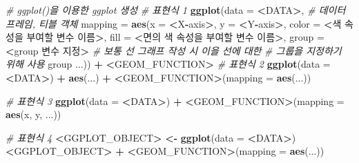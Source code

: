 \documentclass[
  11pt,
]{krantz}
\newenvironment{Shaded}{\begin{snugshade}}{\end{snugshade}}
\newcommand{\CommentTok}[1]{\textcolor[rgb]{0.37,0.37,0.37}{\textit{#1}}}
\newcommand{\DataTypeTok}[1]{\textcolor[rgb]{0.27,0.27,0.27}{#1}}
\newcommand{\ErrorTok}[1]{\textcolor[rgb]{0.14,0.14,0.14}{\textbf{#1}}}
\newcommand{\KeywordTok}[1]{\textcolor[rgb]{0.27,0.27,0.27}{\textbf{#1}}}
\newcommand{\NormalTok}[1]{#1}
\newcommand{\OperatorTok}[1]{\textcolor[rgb]{0.43,0.43,0.43}{\textbf{#1}}}
\newcommand{\StringTok}[1]{\textcolor[rgb]{0.5,0.5,0.5}{#1}}
\begin{document}
\begin{Shaded}
\begin{Highlighting}[]
\CommentTok{# ggplot()을 이용한 ggplot 생성}
\CommentTok{# 표현식 1}
\KeywordTok{ggplot}\NormalTok{(}\DataTypeTok{data =} \OperatorTok{<}\NormalTok{DATA}\OperatorTok{>}\NormalTok{, }\CommentTok{# 데이터 프레임, 티블 객체}
       \DataTypeTok{mapping =} \KeywordTok{aes}\NormalTok{(}\DataTypeTok{x =} \OperatorTok{<}\NormalTok{X}\OperatorTok{-}\NormalTok{axis}\OperatorTok{>}\NormalTok{, }
                     \DataTypeTok{y =} \OperatorTok{<}\NormalTok{Y}\OperatorTok{-}\NormalTok{axis}\OperatorTok{>}\NormalTok{, }
                     \DataTypeTok{color =} \OperatorTok{<}\NormalTok{색 속성을 부여할 변수 이름}\OperatorTok{>}\NormalTok{, }
                     \DataTypeTok{fill =} \OperatorTok{<}\NormalTok{면의 색 속성을 부여할 변수 이름}\OperatorTok{>}\NormalTok{, }
                     \DataTypeTok{group =} \OperatorTok{<}\NormalTok{group 변수 지정}\OperatorTok{>}
\StringTok{                             }\CommentTok{# 보통 선 그래프 작성 시 이을 선에 대한 }
\StringTok{                             }\CommentTok{# 그룹을 지정하기 위해 사용}
\StringTok{                     }\NormalTok{group}
\NormalTok{                     ...)) }\OperatorTok{+}\StringTok{ }
\StringTok{  }\ErrorTok{<}\NormalTok{GEOM_FUNCTION}\OperatorTok{>}
\CommentTok{# 표현식 2}
\KeywordTok{ggplot}\NormalTok{(}\DataTypeTok{data =} \OperatorTok{<}\NormalTok{DATA}\OperatorTok{>}\NormalTok{) }\OperatorTok{+}\StringTok{ }
\StringTok{  }\KeywordTok{aes}\NormalTok{(...) }\OperatorTok{+}\StringTok{ }
\StringTok{  }\ErrorTok{<}\NormalTok{GEOM_FUNCTION}\OperatorTok{>}\NormalTok{(}\DataTypeTok{mapping =} \KeywordTok{aes}\NormalTok{(...))}

\CommentTok{# 표현식 3}
\KeywordTok{ggplot}\NormalTok{(}\DataTypeTok{data =} \OperatorTok{<}\NormalTok{DATA}\OperatorTok{>}\NormalTok{) }\OperatorTok{+}\StringTok{ }
\StringTok{  }\ErrorTok{<}\NormalTok{GEOM_FUNCTION}\OperatorTok{>}\NormalTok{(}\DataTypeTok{mapping =} \KeywordTok{aes}\NormalTok{(x, y, ...))}


\CommentTok{# 표현식 4}
\OperatorTok{<}\NormalTok{GGPLOT_OBJECT}\OperatorTok{>}\StringTok{ }\ErrorTok{<}\OperatorTok{-}\StringTok{ }\KeywordTok{ggplot}\NormalTok{(}\DataTypeTok{data =} \OperatorTok{<}\NormalTok{DATA}\OperatorTok{>}\NormalTok{)}
\OperatorTok{<}\NormalTok{GGPLOT_OBJECT}\OperatorTok{>}\StringTok{ }\OperatorTok{+}\StringTok{ }
\StringTok{  }\ErrorTok{<}\NormalTok{GEOM_FUNCTION}\OperatorTok{>}\NormalTok{(}\DataTypeTok{mapping =} \KeywordTok{aes}\NormalTok{(...))}
\end{Highlighting}
\end{Shaded}
\end{document}
